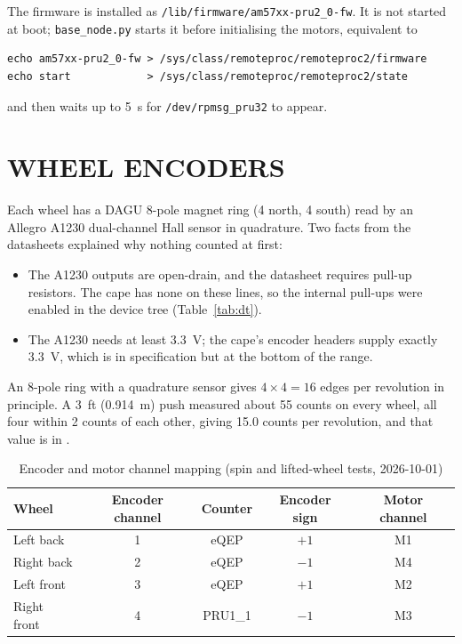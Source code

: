 The firmware is installed as \texttt{/lib/firmware/am57xx-pru2\_0-fw}. It is
not started at boot; \texttt{base\_node.py} starts it before initialising the
motors, equivalent to
\begin{lstlisting}
echo am57xx-pru2_0-fw > /sys/class/remoteproc/remoteproc2/firmware
echo start            > /sys/class/remoteproc/remoteproc2/state
\end{lstlisting}
and then waits up to \SI{5}{s} for \texttt{/dev/rpmsg\_pru32} to appear.

\section{WHEEL ENCODERS}

Each wheel has a DAGU 8-pole magnet ring (4 north, 4 south) read by an Allegro
A1230 dual-channel Hall sensor in quadrature. Two facts from the datasheets
explained why nothing counted at first:
\begin{itemize}
\item The A1230 outputs are open-drain, and the datasheet requires pull-up
  resistors. The cape has none on these lines, so the internal pull-ups were
  enabled in the device tree (Table~\ref{tab:dt}).
\item The A1230 needs at least \SI{3.3}{V}; the cape's encoder headers supply
  exactly \SI{3.3}{V}, which is in specification but at the bottom of the range.
\end{itemize}

An 8-pole ring with a quadrature sensor gives $4\times 4 = 16$ edges per
revolution in principle. A \SI{3}{ft} (\SI{0.914}{m}) push measured about 55
counts on every wheel, all four within 2 counts of each other, giving
\num{15.0} counts per revolution, and that value is in .

\begin{table}[htbp]
\centering
\caption{Encoder and motor channel mapping (spin and lifted-wheel tests, 2026-10-01)}
\label{tab:channels}
\small
\begin{tabular}{lcccc}
\toprule
Wheel & Encoder channel & Counter & Encoder sign & Motor channel \\
\midrule
Left back   & 1 & eQEP & $+1$ & M1 \\
Right back  & 2 & eQEP & $-1$ & M4 \\
Left front  & 3 & eQEP & $+1$ & M2 \\
Right front & 4 & PRU1\_1 & $-1$ & M3 \\
\bottomrule
\end{tabular}
\end{table}

